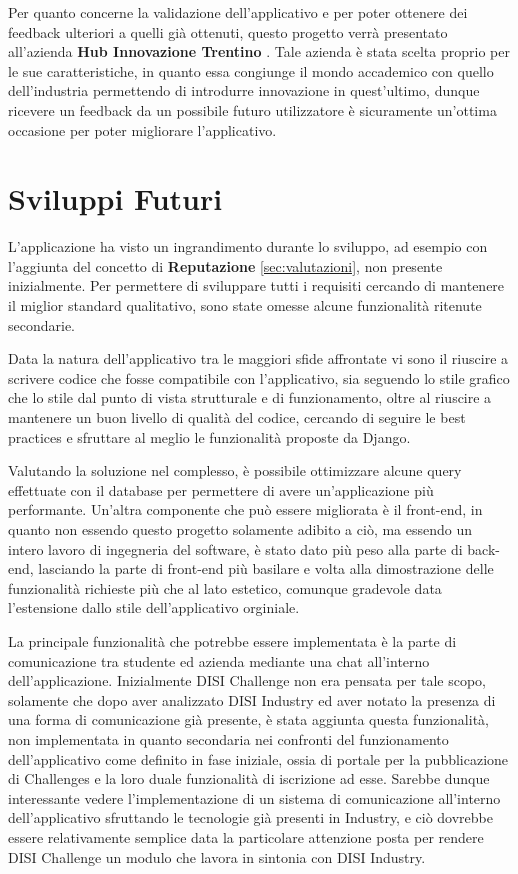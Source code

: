 Per quanto concerne la validazione dell'applicativo e per poter ottenere dei feedback ulteriori a quelli già ottenuti, questo progetto verrà presentato all'azienda \textbf{Hub Innovazione Trentino} \cite{HiT}. Tale azienda è stata scelta proprio per le sue caratteristiche, in quanto essa congiunge il mondo accademico con quello dell'industria permettendo di introdurre innovazione in quest'ultimo, dunque ricevere un feedback da un possibile futuro utilizzatore è sicuramente un'ottima occasione per poter migliorare l'applicativo.


\section{Sviluppi Futuri}
L'applicazione ha visto un ingrandimento durante lo sviluppo, ad esempio con l'aggiunta del concetto di \textbf{Reputazione} \ref{sec:valutazioni}, non presente inizialmente. Per permettere di sviluppare tutti i requisiti cercando di mantenere il miglior standard qualitativo, sono state omesse alcune funzionalità ritenute secondarie.


Data la natura dell'applicativo tra le maggiori sfide affrontate vi sono il riuscire a scrivere codice che fosse compatibile con l'applicativo, sia seguendo lo stile grafico che lo stile dal punto di vista strutturale e di funzionamento, oltre al riuscire a mantenere un buon livello di qualità del codice, cercando di seguire le best practices e sfruttare al meglio le funzionalità proposte da Django.


Valutando la soluzione nel complesso, è possibile ottimizzare alcune query effettuate con il database per permettere di avere un'applicazione più performante. Un'altra componente che può essere migliorata è il front-end, in quanto non essendo questo progetto solamente adibito a ciò, ma essendo un intero lavoro di ingegneria del software, è stato dato più peso alla parte di back-end, lasciando la parte di front-end più basilare e volta alla dimostrazione delle funzionalità richieste più che al lato estetico, comunque gradevole data l'estensione dallo stile dell'applicativo orginiale.


La principale funzionalità che potrebbe essere implementata è la parte di comunicazione tra studente ed azienda mediante una chat all'interno dell'applicazione. Inizialmente DISI Challenge non era pensata per tale scopo, solamente che dopo aver analizzato DISI Industry ed aver notato la presenza di una forma di comunicazione già presente, è stata aggiunta questa funzionalità, non implementata in quanto secondaria nei confronti del funzionamento dell'applicativo come definito in fase iniziale, ossia di portale per la pubblicazione di Challenges e la loro duale funzionalità di iscrizione ad esse. Sarebbe dunque interessante vedere l'implementazione di un sistema di comunicazione all'interno dell'applicativo sfruttando le tecnologie già presenti in Industry, e ciò dovrebbe essere relativamente semplice data la particolare attenzione posta per rendere DISI Challenge un modulo che lavora in sintonia con DISI Industry.


